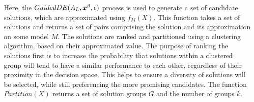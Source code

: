 \documentclass[journal]{IEEEtran}
\begin{document}
\begin{algorithm}[h!] 
\caption{$LocalOCBA$}
\label{alg:local-ocba}
{\footnotesize
\begin{algorithmic}[1]
 
 
 
 
\label{while-loop}
   
   
   
   
   
\ENDWHILE
{} 
\end{algorithmic}
}
\end{algorithm}

Here, the $GuidedDE(A_L,\boldsymbol{x}^\beta,\epsilon)$ process is used to generate a set of candidate solutions, which are approximated using $f_M(X)$. This function takes a set of solutions and returns a set of pairs comprising the solution and its approximation on some model $M$. The solutions are ranked and partitioned using a clustering algorithm, based on their approximated value. The purpose of ranking the solutions first is to increase the probability that solutions within a clustered group will tend to have a similar performance to each other, regardless of their proximity in the decision space. This helps to ensure a diversity of solutions will be selected, while still preferencing the more promising candidates. The function $Partition(X)$ returns a set of solution groups $G$ and the number of groups $k$.
\end{document}
